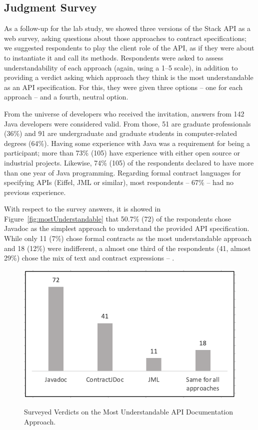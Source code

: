 \subsection{Judgment Survey}
\label{sec:surveyResults}

As a follow-up for the lab study, we showed three versions of the Stack API as a web survey, asking questions about those approaches to contract specifications; we suggested respondents to play the client role of the API, as if they were about to instantiate it and call its methods.
Respondents were asked to assess understandability of each approach (again, using a 1--5 scale), in addition to providing a verdict asking which approach they think is the most understandable as an API specification. For this, they were given three options -- one for each approach -- and a fourth, neutral option.

From the universe of developers who received the invitation, answers from 142 Java developers were considered valid.
From those, 51 are graduate professionals (36\%) and 91 are undergraduate and graduate students in computer-related degrees (64\%).
Having some experience with Java was a requirement for being a participant; more than 73\% (105) have experience with either open source or industrial projects. Likewise, 74\% (105) of the respondents declared to have more than one year of Java programming.
Regarding formal contract languages for specifying APIs (Eiffel, JML or similar), most respondents -- 67\% -- had no previous experience. 


With respect to the survey answers, it is showed in Figure~\ref{fig:mostUnderstandable} that 50.7\% (72) of the respondents chose Javadoc as the simplest approach to understand the provided API specification. 
While only 11 (7\%) chose formal contracts as the most understandable approach and 18 (12\%) were indifferent, a almost one third of the respondents (41, almost 29\%) chose the mix of text and contract expressions -- \contractjdoc{}.


\begin{figure}
\centering
\includegraphics[width=0.7\linewidth]{figs/mostUnderstandable.png}
\label{fig:mostUnderstandable}
\caption{Surveyed Verdicts on the Most Understandable API Documentation Approach.}
\label{fig:surveyResults}
\end{figure}





